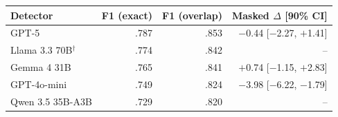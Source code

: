 \begin{tabular}{lrrr}
\toprule
Detector & F1 (exact) & F1 (overlap) & Masked $\Delta$ [90\% CI]\\
\midrule
GPT-5 & .787 & .853 & $-$0.44 [$-$2.27, $+$1.41]\\
Llama 3.3 70B$^\dagger$ & .774 & .842 & --\\
Gemma 4 31B & .765 & .841 & $+$0.74 [$-$1.15, $+$2.83]\\
GPT-4o-mini & .749 & .824 & $-$3.98 [$-$6.22, $-$1.79]\\
Qwen 3.5 35B-A3B & .729 & .820 & --\\
\bottomrule
\end{tabular}
